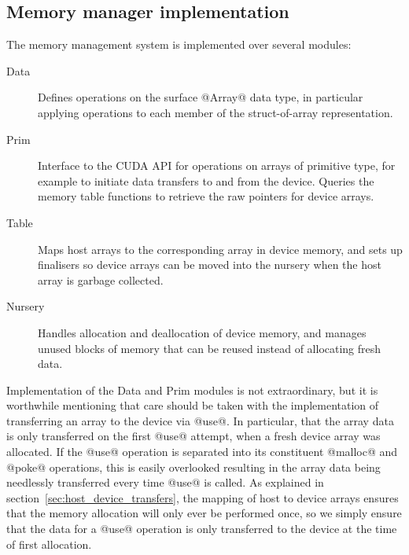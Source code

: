 % 

\subsection{Memory manager implementation}
\label{sec:memory_manager_implementation}

The memory management system is implemented over several modules:
%
\begin{description}
\item[Data] Defines operations on the surface @Array@ data type, in
    particular applying operations to each member of the struct-of-array
    representation.

\item[Prim] Interface to the CUDA API for operations on arrays of primitive
    type, for example to initiate data transfers to and from the device. Queries
    the memory table functions to retrieve the raw pointers for device arrays.

\item[Table] Maps host arrays to the corresponding array in device memory, and
    sets up finalisers so device arrays can be moved into the nursery when the
    host array is garbage collected.

\item[Nursery] Handles allocation and deallocation of device memory, and
    manages unused blocks of memory that can be reused instead of allocating
    fresh data.
\end{description}

Implementation of the Data and Prim modules is not extraordinary, but it is
worthwhile mentioning that care should be taken with the implementation of
transferring an array to the device via @use@. In particular, that the
array data is only transferred on the first @use@ attempt, when a fresh
device array was allocated. If the @use@ operation is separated into its
constituent @malloc@ and @poke@ operations, this is easily overlooked
resulting in the array data being needlessly transferred every time @use@
is called. As explained in section~\ref{sec:host_device_transfers}, the mapping
of host to device arrays ensures that the memory allocation will only ever be
performed once, so we simply ensure that the data for a @use@ operation is
only transferred to the device at the time of first allocation.

